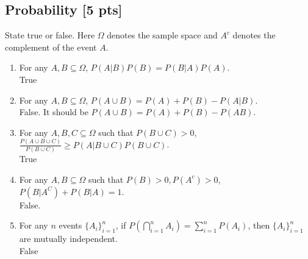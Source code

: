 \documentclass[a4paper]{article}
\theoremstyle{definition}
\newenvironment{soln}{
    \leavevmode\color{blue}\ignorespaces
}{}
\begin{document}
\subsection{Probability [5 pts]}
State true or false. Here $\Omega$ denotes the sample space and $A^c$ denotes the complement of the event $A$.
\begin{enumerate}
\item For any $A, B \subseteq \Omega$, $P(A|B)P(B) = P(B|A)P(A)$.\\
  \begin{soln}  True \end{soln}
\item For any $A, B \subseteq \Omega$, $P(A \cup B) = P(A) + P(B) - P(A | B)$.\\         
  \begin{soln}  False. It should be $P(A \cup B) = P(A) + P(B) - P(AB)$.  \end{soln}
\item For any $A, B, C \subseteq \Omega$ such that $P(B \cup C) > 0$,
  $\frac{P(A \cup B \cup C)}{P(B \cup C)} \geq P(A | B \cup C) P(B \cup C)$.\\ \begin{soln}  True\end{soln}
\item For any $A, B\subseteq\Omega$ such that $P(B) > 0, P(A^c) > 0$,
  $P(B|A^C) + P(B|A) = 1$.\\ 
  \begin{soln}  False. \end{soln}
\item For any $n$ events $\{A_i\}_{i=1}^n$, if
  $P(\bigcap_{i=1}^n A_i) = \sum_{i=1}^n P(A_i)$, then
  $\{A_i\}_{i=1}^n$ are mutually independent.\\
  \begin{soln}  False \end{soln}
\end{enumerate}
\end{document}
